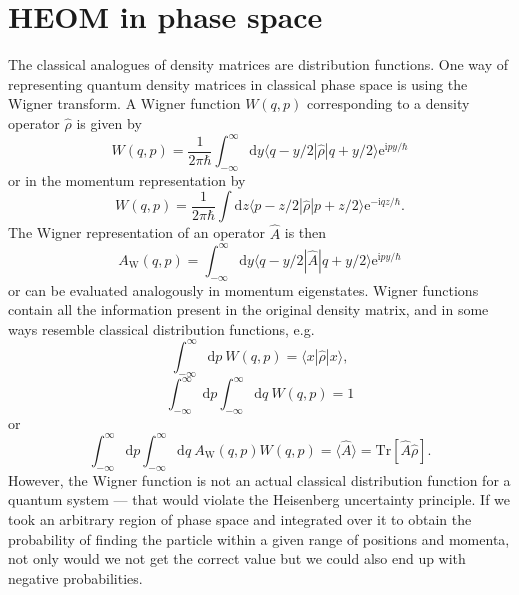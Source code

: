 \section{HEOM in phase space}\label{sec:phase_space}
The classical analogues of density matrices are distribution functions. One way of representing quantum density matrices in classical phase space is using the Wigner transform.\supercite{Kubo1964,Hillery1984,Case2008} A Wigner function $W(q,p)$ corresponding to a density operator $\hat{\rho}$ is given by
\begin{equation}
	W(q,p) = \frac{1}{2\pi\hbar}\int_{-\infty}^\infty\mathrm{d}y \langle q-y/2|\hat{\rho}|q+y/2\rangle \mathrm{e}^{\mathrm{i}py/\hbar}
\end{equation}
or in the momentum representation by
\begin{equation}
W(q,p) = \frac{1}{2\pi\hbar}\int\mathrm{d}z \langle p-z/2|\hat{\rho}|p+z/2\rangle \mathrm{e}^{-\mathrm{i}qz/\hbar}.
\end{equation}
The Wigner representation of an operator $\hat{A}$ is then
\begin{equation}
	A_\mathrm{W}(q,p)=\int_{-\infty}^\infty\mathrm{d}y \langle q-y/2|\hat{A}|q+y/2\rangle \mathrm{e}^{\mathrm{i}py/\hbar}
\end{equation}
or can be evaluated analogously in momentum eigenstates. Wigner functions contain all the information present in the original density matrix, and in some ways resemble classical distribution functions, e.g.
\begin{equation}
	\int_{-\infty}^\infty \mathrm{d}p\ W(q,p)= \langle x|\hat{\rho}|x\rangle,
\end{equation}
\begin{equation}
\int_{-\infty}^\infty \mathrm{d}p \int_{-\infty}^\infty \mathrm{d}q\ W(q,p)= 1
\end{equation}
or
\begin{equation}
\int_{-\infty}^\infty \mathrm{d}p \int_{-\infty}^\infty \mathrm{d}q\ A_\mathrm{W}(q,p)W(q,p)= \langle \hat{A}\rangle = \mathrm{Tr}[\hat{A}\hat{\rho}].
\end{equation}
However, the Wigner function is not an actual classical distribution function for a quantum system --- that would violate the Heisenberg uncertainty principle. If we took an arbitrary region of phase space and integrated over it to obtain the probability of finding the particle within a given range of positions and momenta, not only would we not get the correct value but we could also end up with negative probabilities.\supercite{Case2008}

